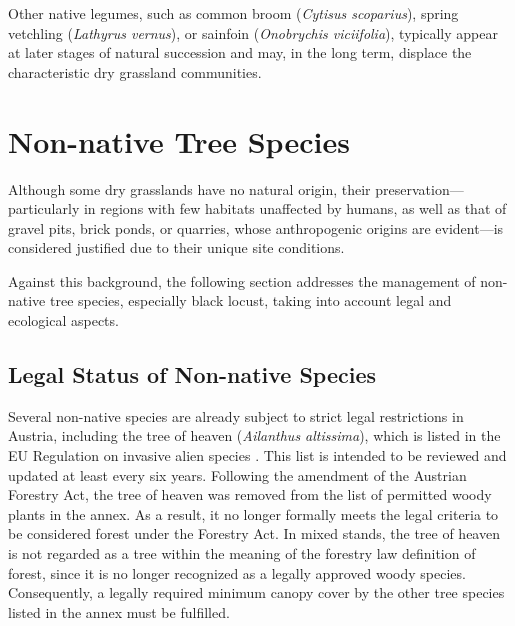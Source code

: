 Other native legumes, such as common broom (\emph{Cytisus scoparius}), spring vetchling (\emph{Lathyrus vernus}), or sainfoin (\emph{Onobrychis viciifolia}), typically appear at later stages of natural succession and may, in the long term, displace the characteristic dry grassland communities.

\section{Non-native Tree Species}


Although some dry grasslands have no natural origin, their preservation—particularly in regions with few habitats unaffected by humans, as well as that of gravel pits, brick ponds, or quarries, whose anthropogenic origins are evident—is considered justified due to their unique site conditions.

Against this background, the following section addresses the management of non-native tree species, especially black locust, taking into account legal and ecological aspects.


\subsection{Legal Status of Non-native Species}%

Several non-native species are already subject to strict legal restrictions in Austria, including the tree of heaven (\emph{Ailanthus altissima}), which is listed in the EU Regulation on invasive alien species \citep{eu2019verordnungListeInvasiverArten,eu2014verordnungInvasiverArten}. This list is intended to be reviewed and updated at least every six years. Following the amendment of the Austrian Forestry Act, the tree of heaven was removed from the list of permitted woody plants in the annex. As a result, it no longer formally meets the legal criteria to be considered forest under the Forestry Act. In mixed stands, the tree of heaven is not regarded as a tree within the meaning of the forestry law definition of forest, since it is no longer recognized as a legally approved woody species. Consequently, a legally required minimum canopy cover by the other tree species listed in the annex must be fulfilled.

